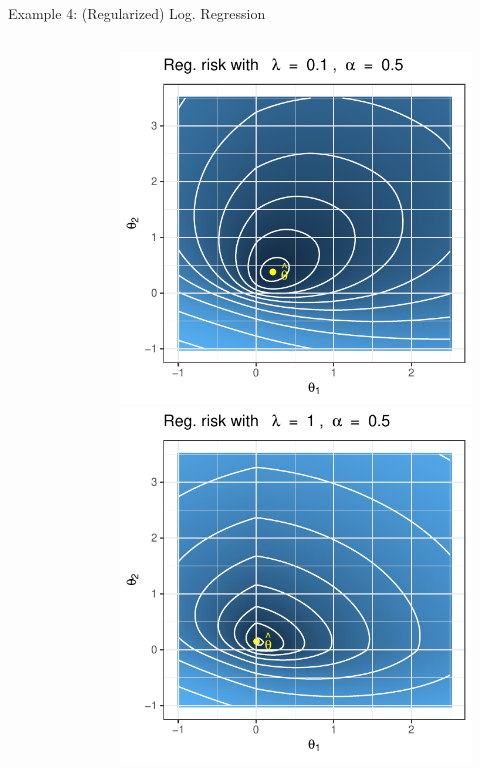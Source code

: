 \documentclass[11pt,compress,t,notes=noshow, xcolor=table]{beamer}
\begin{document}
\begin{vbframe}{Example 4: (Regularized) Log. Regression}
\begin{columns}
\begin{column}{.3\textwidth}
\begin{figure}
\end{figure}
\end{column}
\begin{column}{.3\textwidth}
\begin{figure}
	\includegraphics{figure_man/logreg-0.5-0.1.pdf}\\
	\includegraphics{figure_man/logreg-0.5-1.pdf} 

\end{figure}
\end{column}
\end{columns}
\end{vbframe}
\end{document}
